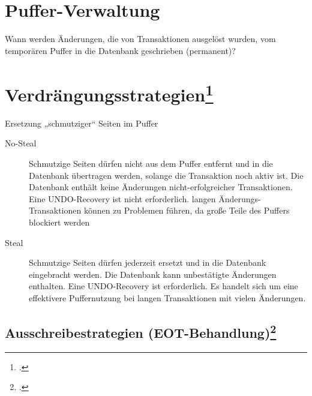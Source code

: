 \documentclass{lehramt-informatik-haupt}
\begin{document}
%

\section{Puffer-Verwaltung}

\cite[Kapitel 10.2.1 Ersetzung von Puffer-Seiten Seite 311]{kemper}

Wann werden Änderungen, die von Transaktionen ausgelöst wurden, vom
temporären Puffer in die Datenbank geschrieben (permanent)?

%

\section{Verdrängungsstrategien\footcite[Kapitel 10.2.1 Ersetzung von
Puffer-Seiten Seite 311-312]{kemper}}

Ersetzung „schmutziger“ Seiten im Puffer

\begin{description}

\item [No-Steal]

Schmutzige Seiten dürfen nicht aus dem Puffer entfernt und in die
Datenbank übertragen werden, solange die Transaktion noch aktiv ist. Die
Datenbank enthält keine Änderungen nicht-erfolgreicher Transaktionen.
Eine UNDO-Recovery ist nicht erforderlich. langen
Änderungs-Transaktionen können zu Problemen führen, da große Teile des
Puffers blockiert werden

\item [Steal]

Schmutzige Seiten dürfen jederzeit ersetzt und in die Datenbank
eingebracht werden. Die Datenbank kann unbestätigte Änderungen
enthalten. Eine UNDO-Recovery ist erforderlich. Es handelt sich um eine
effektivere Puffernutzung bei langen Transaktionen mit vielen
Änderungen.
\end{description}

%

\subsection{Ausschreibestrategien (EOT-Behandlung)\footcite[Kapitel
10.2.2 Einbringen von Änderungen einer Transaktion Seite
312-313]{kemper}}
\end{document}
